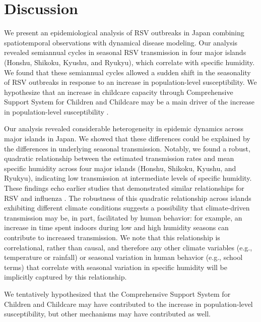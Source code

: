 \documentclass[12pt]{article}
\begin{document}
\section*{Discussion}

We present an epidemiological analysis of RSV outbreaks in Japan combining spatiotemporal observations with dynamical disease modeling.
Our analysis revealed semiannual cycles in seasonal RSV transmission in four major islands (Honshu, Shikoku, Kyushu, and Ryukyu), which correlate with specific humidity.
We found that these semiannual cycles allowed a sudden shift in the seasonality of RSV outbreaks in response to an increase in population-level susceptibility.
We hypothesize that an increase in childcare capacity through Comprehensive Support System for Children and Childcare may be a main driver of the increase in population-level susceptibility \citep{dehaan2024age}.

Our analysis revealed considerable heterogeneity in epidemic dynamics across major islands in Japan.
We showed that these differences could be explained by the differences in underlying seasonal transmission.
Notably, we found a robust, quadratic relationship between the estimated transmission rates and mean specific humidity across four major islands (Honshu, Shikoku, Kyushu, and Ryukyu), indicating low transmission at intermediate levels of specific humidity.
These findings echo earlier studies that demonstrated similar relationships for RSV \citep{baker2019epidemic} and influenza \citep{lowen2007influenza,shaman2009absolute,shaman2010absolute,tamerius2013environmental,lowen2014roles}.
The robustness of this quadratic relationship across islands exhibiting different climate conditions suggests a possibility that climate-driven transmission may be, in part, facilitated by human behavior: for example, an increase in time spent indoors during low and high humidity seasons can contribute to increased transmission.
We note that this relationship is correlational, rather than causal, and therefore any other climate variables (e.g., temperature or rainfall) or seasonal variation in human behavior (e.g., school terms) that correlate with seasonal variation in specific humidity will be implicitly captured by this relationship.

We tentatively hypothesized that the Comprehensive Support System for Children and Childcare may have contributed to the increase in population-level susceptibility, but other mechanisms may have contributed as well.
\end{document}
